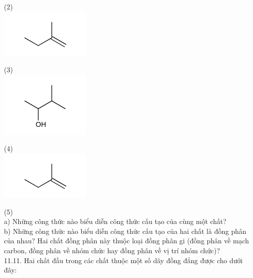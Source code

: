 \documentclass[10pt]{article}
\begin{document}
(2)\\
\includegraphics{smile-acf20f252aaefb5089ca8380a28675f725933ab8}

(3)\\
\includegraphics{smile-ff2fc8e37372b6da30bd465d5a37ed01411c4efb}

(4)\\
\includegraphics{smile-3f9d830d7f197ce110a24261f7f7614e2b471d64}

(5)\\
a) Những công thức nào biểu diễn công thức cấu tạo của cùng một chất?\\
b) Những công thức nào biểu diễn công thức cấu tạo của hai chất là đồng phân của nhau? Hai chất đồng phân này thuộc loại đồng phân gi (đồng phân về mạch carbon, đồng phân về nhóm chức hay đồng phân về vị trí nhóm chức)?\\
11.11. Hai chất đầu trong các chất thuộc một số dãy đồng đẳng được cho dưới đây:
\end{document}
